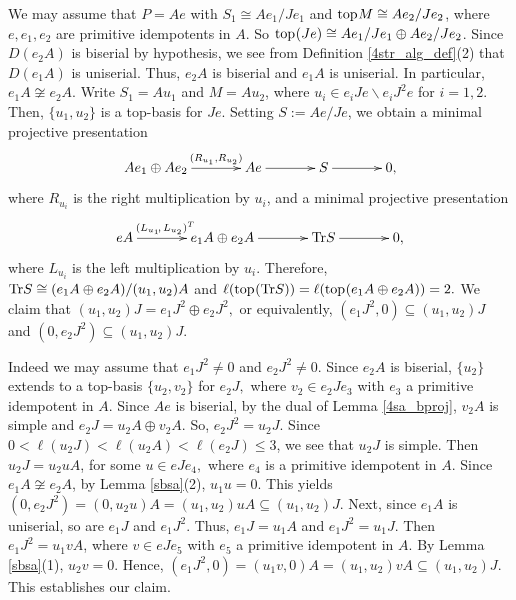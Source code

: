 \documentclass[10pt]{amsart}
\theoremstyle{definition}
\newcommand{\ntop}{{\rm top}\hspace{.5pt}}
\begin{document}
\vspace{-1.5pt}

 We may assume that $P= Ae$ with $S_1\cong Ae_1/Je_1$ and $\ntop M\cong Ae_2/Je_2$, where $e, e_1, e_2$ are primitive idempotents in $A$. So $\ntop(Je)\cong Ae_1/Je_1\oplus Ae_2/Je_2$. Since $D(e_2A)$ is biserial by hypothesis, we see from Definition \ref{4str_alg_def}(2) that $D(e_1A)$ is uniserial. Thus, $e_2A$ is biserial and $e_1A$ is uniserial. In particular, $e_1A\not\cong e_2A$. Write $S_1=Au_1$ and $M=Au_2$, where $u_i\in e_iJe\backslash e_iJ^2e$ for $i=1, 2$. Then, $\{u_1, u_2\}$ is a top-basis for $Je.$ Setting $S:=Ae/Je$, we obtain a minimal projective presentation \vspace{-10pt}
$$\xymatrixcolsep{35pt}\xymatrix{Ae_1\oplus Ae_2 \ar[r]^-{(R_{u_1}, R_{u_2})} & Ae \ar[r] & S\ar[r] & 0,}\vspace{-2pt}$$ where $R_{u_i}$ is the right multiplication by $u_i$, and a minimal projective presentation \vspace{-4pt}
$$\xymatrixcolsep{35pt}\xymatrix{ eA \ar[r]^-{(L_{u_1}\hspace{-1.5pt}, \,L_{u_2})^T\hspace{-5pt}} & e_1A\oplus e_2A \ar[r] & {\rm Tr}S\ar[r] & 0,}\vspace{-3.5pt}$$ where $L_{u_i}$ is the left multiplication by $u_i$. Therefore, ${\rm Tr}S\cong (e_1A\oplus e_2A)/(u_1, u_2)A$ and $\ell(\ntop({\rm Tr} S))=\ell(\ntop(e_1A\oplus e_2A))=2.$ We claim that $(u_1, u_2)J=e_1J^2\oplus e_2J^2,$ or equivalently,  $(e_1J^2, 0)\subseteq (u_1, u_2)J$ and $(0, e_2J^2)\subseteq (u_1, u_2)J.$ 

Indeed we may assume that $e_1J^2\ne 0$ and $e_2J^2\ne 0$. Since $e_2A$ is biserial, $\{u_2\}$ extends to  a top-basis $\{u_2, v_2\}$ for $e_2J,$ where $v_2\in e_2Je_3$ with $e_3$ a primitive idempotent in $A$. Since $Ae$ is biserial, by the dual of Lemma \ref{4sa_bproj}, $v_2A$ is simple and $e_2J=u_2A\oplus v_2A.$ So, $e_2J^2=u_2J$.
Since $0< \ell(u_2J) < \ell(u_2A) < \ell(e_2J)\le 3$, we see that 
$u_2J$ is simple. Then $u_2J=u_2uA$, for some $u\in eJe_4,$ where $e_4$ is a primitive idempotent in $A$. Since $e_1A\not\cong e_2A$, by Lemma \ref{sbsa}(2), $u_1u=0$. This yields $(0, e_2J^2)=(0, u_2u)A=(u_1, u_2)uA\subseteq (u_1, u_2)J.$  
Next, since $e_1A$ is uniserial, so are $e_1J$ and $e_1J^2$. Thus, $e_1J=u_1A$ and $e_1J^2=u_1J$. Then $e_1J^2=u_1v A$, where $v\in eJe_5$ with $e_5$ a primitive idempotent in $A$. By Lemma \ref{sbsa}(1), $u_2v=0$. 
Hence, $(e_1J^2, 0)=(u_1v, 0)A=(u_1, u_2)vA\subseteq (u_1, u_2)J.$ This establishes our claim. 
\end{document}
